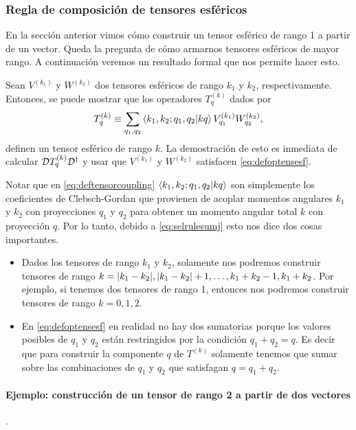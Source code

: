 \documentclass[10pt, a4paper]{article}
\numberwithin{equation}{subsection}
\begin{document}
\subsubsection{Regla de composición de tensores esféricos}
\label{sec:reglacomptens}

En la sección anterior vimos cómo construir un tensor esférico de rango 1 a
partir de un vector. Queda la pregunta de cómo armarnos tensores esféricos de
mayor rango. A continuación veremos un resultado formal que nos permite hacer
esto.

\bigbreak

Sean $V^{(k_1)}$ y $W^{(k_2)}$ dos tensores esféricos de rango $k_1$ y $k_2$,
respectivamente. Entonces, se puede mostrar que los operadores $T^{(k)}_q$
dados por
\begin{equation} \label{eq:deftensorcoupling}
  T^{(k)}_{q} \equiv \sum_{q_1, q_2} \braket{k_1,k_2;q_1,q_2}{kq}
  V^{(k_1)}_{q_1} W^{(k_2)}_{q_2},
\end{equation}
definen un tensor esférico de rango $k$. La demostración de esto es inmediata
de calcular $\RotationOp T^{(k)}_{q} \RotationOp^\dagger$ y usar que $V^{(k_1)}$
y $W^{(k_2)}$ satisfacen \eqref{eq:defoptensesf}.

Notar que en \eqref{eq:deftensorcoupling} $\braket{k_1,k_2;q_1,q_2}{kq}$ son
simplemente los coeficientes de Clebsch-Gordan que provienen de acoplar
momentos angulares $k_1$ y $k_2$ con proyecciones $q_1$ y $q_2$ para obtener un
momento angular total $k$ con proyección $q$. Por lo tanto, debido a
\eqref{eq:selrulesumj} esto nos dice dos cosas importantes.
\begin{itemize}
  \item Dados los tensores de rango $k_1$ y $k_2$, solamente nos podremos
    construir tensores de rango $k = \abs{k_1 - k_2}, \abs{k_1 - k_2} + 1,
    \ldots, k_1 + k_2 - 1, k_1 + k_2$. Por ejemplo, si tenemos dos tensores de
    rango 1, entonces nos podremos construir tensores de rango $k = 0, 1, 2$.
  \item En \eqref{eq:defoptensesf} en realidad no hay dos sumatorias porque los
    valores posibles de $q_1$ y $q_2$ están restringidos por la condición $q_1
    + q_2 = q$. Es decir que para construir la componente $q$ de $T^{(k)}$
    solamente tenemos que sumar sobre las combinaciones de $q_1$ y $q_2$ que
    satisfagan $q = q_1 + q_2$.
\end{itemize}

\paragraph{Ejemplo: construcción de un tensor de rango 2 a partir de dos
  vectores}. \\
\end{document}
